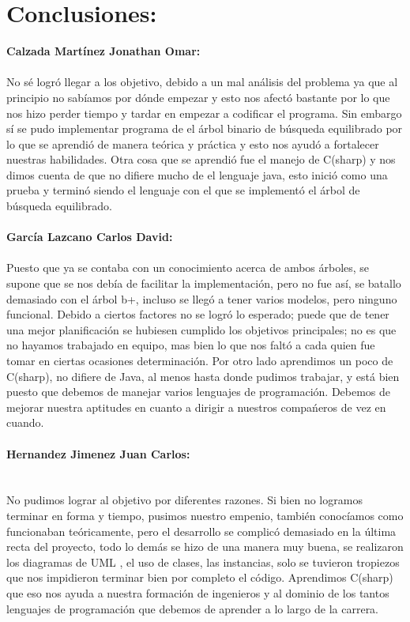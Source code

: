 \documentclass[11pt,a4paper]{report}
\begin{document}
\section{Conclusiones:}
\textbf{Calzada Mart\'inez Jonathan Omar:}
\\
\\
No s\'e logr\'o llegar a los objetivo, debido a un mal an\'alisis del problema ya que al principio no sab\'iamos por d\'onde empezar y esto nos afect\'o bastante por lo que nos hizo perder tiempo y tardar en empezar a codificar el programa. Sin embargo s\'i se pudo implementar  programa de el \'arbol binario de b\'usqueda equilibrado por lo que se aprendi\'o de manera te\'orica y pr\'actica y esto nos ayud\'o a fortalecer nuestras habilidades. 
Otra cosa que se aprendi\'o fue el manejo de C(sharp) y nos dimos cuenta de que no difiere mucho de el lenguaje java, esto inici\'o como una prueba y termin\'o siendo el lenguaje con el que se implement\'o el \'arbol de b\'usqueda equilibrado. 
\\
\\
\textbf{Garc\'ia Lazcano Carlos David:}
\\
\\
Puesto que ya se contaba con un conocimiento acerca de ambos \'arboles, se supone que se nos deb\'ia de facilitar la implementaci\'on, pero no fue as\'i, se batallo demasiado con el \'arbol b+, incluso se lleg\'o a tener varios modelos, pero ninguno funcional.
Debido a ciertos factores no se logr\'o lo esperado; puede que de tener una mejor planificaci\'on se hubiesen cumplido los objetivos principales; no es que no hayamos trabajado en equipo, mas bien lo que nos falt\'o a cada quien fue tomar en ciertas ocasiones determinaci\'on.
Por otro lado aprendimos un poco de C(sharp), no difiere de Java, al menos hasta donde pudimos trabajar, y est\'a bien puesto que debemos de manejar varios lenguajes de programaci\'on.  Debemos de mejorar nuestra aptitudes en cuanto a dirigir a nuestros compa\'neros de vez en cuando.
\\
\\
\textbf{Hernandez Jimenez Juan Carlos:}
\\
\\
\\
No pudimos lograr al objetivo por diferentes razones. Si bien no logramos terminar en forma y tiempo, pusimos nuestro empenio, tambi\'en conoc\'iamos como funcionaban  te\'oricamente, pero el desarrollo se complic\'o demasiado en la \'ultima recta del proyecto, todo lo dem\'as se hizo de una manera muy buena, se realizaron los diagramas de UML , el uso de clases, las instancias, solo se tuvieron tropiezos que nos impidieron terminar bien por completo el c\'odigo. Aprendimos C(sharp) que eso nos ayuda a nuestra formaci\'on de ingenieros y al dominio de los tantos lenguajes de programaci\'on que debemos de aprender a lo largo de la carrera.
\\
\\
\end{document}
